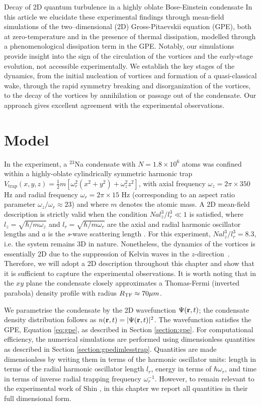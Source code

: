 \begin{chapter}{\label{cha:shin}Decay of 2D quantum turbulence in a highly oblate Bose-Einstein condensate}
 In this article we elucidate these experimental
findings through mean-field simulations of the two--dimensional (2D) Gross-Pitaevskii equation (GPE), both at zero-temperature and in the presence of 
thermal dissipation, modelled through a phenomenological dissipation term in 
the GPE.  Notably, our simulations provide insight into the sign of the circulation of the vortices and the early-stage evolution, not accessible experimentally.  We establish the key stages of the dynamics, from the initial nucleation of vortices and formation of a quasi-classical wake, through the rapid symmetry breaking and disorganization of the vortices, to the decay of the vortices by annihilation or passage out of the condensate.  Our approach gives excellent agreement with the experimental observations.  

\section{Model}
In the experiment, a $^{23}$Na condensate with $N=1.8\times 10^6$ atoms was confined within a highly-oblate cylindrically symmetric harmonic trap $V_{\mathrm{trap}}(x,y,z)=\frac{1}{2}m[\omega_r^2 (x^2+y^2) +\omega_z^2 z^2 ]$, with axial frequency $\omega_z=2 \pi \times 350$ Hz and radial frequency $\omega_r=2\pi \times 15$ Hz (corresponding to an aspect ratio parameter $\omega_z/\omega_r \approx 23$) and where $m$ denotes the atomic mass.  
A 2D mean-field description is strictly valid when 
the condition $N a l_z^3/l_r^3 \ll 1$ is satisfied, 
where $l_z=\sqrt{\hbar/m \omega_z}$ and $l_r=\sqrt{\hbar/m\omega_r}$ 
are the axial and radial harmonic oscillator lengths and $a$ is 
the {\it s}-wave scattering length \cite{delgado,parker2008}.  
For this experiment, $N a l_z^3/l_r^3=8.3$, i.e. the system remains 
3D in nature.   Nonetheless, the dynamics of the vortices is essentially 2D 
due to the suppression of Kelvin waves in 
the $z$-direction~\citep{jackson_proukakis_09}.  
Therefore, we will adopt a 2D description throughout this chapter and 
show that it is sufficient to capture the experimental observations.  
It is worth noting that in the $xy$ plane the condensate 
closely approximates a Thomas-Fermi (inverted parabola) density 
profile with radius $R_{\rm TF}\approx70 \mu m$.

We parametrise the condensate by the 2D wavefunction $\Psi({\bf r},t)$; the condensate density distribution follows as $n({\bf r},t)=|\Psi({\bf r},t)|^2$.  The wavefunction satisfies the GPE, Equation \ref{eq:gpe}, as described in Section \ref{section:gpe}. For computational efficiency, the numerical simulations are performed using dimensionless quantities as described in Section \ref{section:gpedimlesstrap}. Quantities are made dimensionless by writing them in terms of the harmonic oscillator units: length in terms of the radial harmonic oscillator length $l_r$, energy in terms of $\hbar\omega_r$, and time in terms of inverse radial trapping frequency $\omega_r^{-1}$. However, to remain relevant to the experimental work of Shin \etal, in this chapter we report all quantities in their full dimensional form.


\end{chapter}
